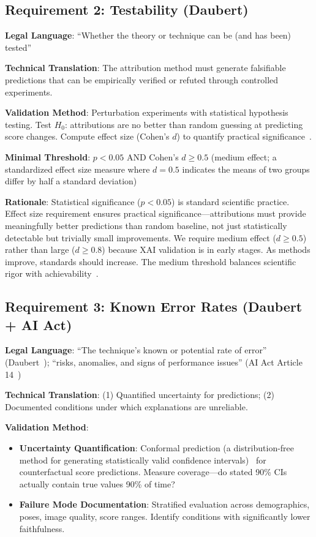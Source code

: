 \subsection{Requirement 2: Testability (Daubert)}

\textbf{Legal Language}: ``Whether the theory or technique can be (and has been) tested''~\cite{daubert1993}

\textbf{Technical Translation}: The attribution method must generate falsifiable predictions that can be empirically verified or refuted through controlled experiments.

\textbf{Validation Method}: Perturbation experiments with statistical hypothesis testing. Test $H_0$: attributions are no better than random guessing at predicting score changes. Compute effect size (Cohen's $d$) to quantify practical significance~\cite{cohen1988statistical}.

\textbf{Minimal Threshold}: $p < 0.05$ AND Cohen's $d \geq 0.5$ (medium effect; a standardized effect size measure where $d = 0.5$ indicates the means of two groups differ by half a standard deviation)

\textbf{Rationale}: Statistical significance ($p < 0.05$) is standard scientific practice. Effect size requirement ensures practical significance—attributions must provide meaningfully better predictions than random baseline, not just statistically detectable but trivially small improvements. We require medium effect ($d \geq 0.5$) rather than large ($d \geq 0.8$) because XAI validation is in early stages. As methods improve, standards should increase. The medium threshold balances scientific rigor with achievability~\cite{cohen1988statistical}.

\subsection{Requirement 3: Known Error Rates (Daubert + AI Act)}

\textbf{Legal Language}: ``The technique's known or potential rate of error'' (Daubert~\cite{daubert1993}); ``risks, anomalies, and signs of performance issues'' (AI Act Article 14~\cite{euaiact2024})

\textbf{Technical Translation}: (1) Quantified uncertainty for predictions; (2) Documented conditions under which explanations are unreliable.

\textbf{Validation Method}:
\begin{itemize}[itemsep=2pt]
    \item \textbf{Uncertainty Quantification}: Conformal prediction (a distribution-free method for generating statistically valid confidence intervals)~\cite{vovk2005conformal} for counterfactual score predictions. Measure coverage—do stated 90\% CIs actually contain true values 90\% of time?
    \item \textbf{Failure Mode Documentation}: Stratified evaluation across demographics, poses, image quality, score ranges. Identify conditions with significantly lower faithfulness.
\end{itemize}

